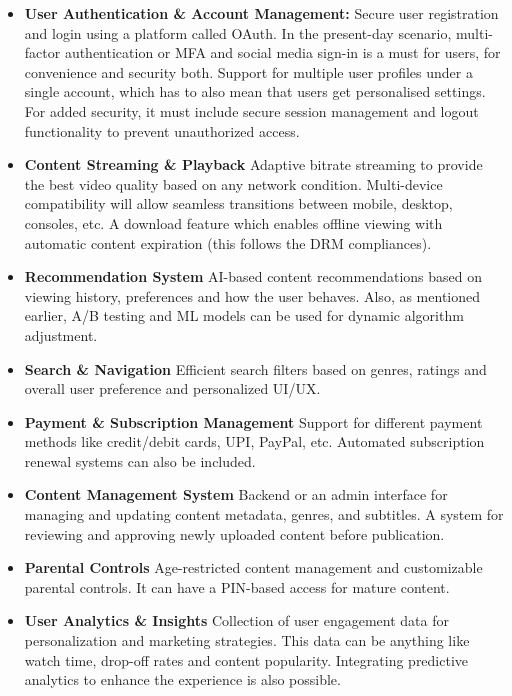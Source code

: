 \documentclass[a4paper,10pt,twoside]{article}
\begin{document}
\begin{itemize}
    \item \textbf{User Authentication \& Account Management:} Secure user registration and login using a platform called OAuth. In the present-day scenario, multi-factor authentication or MFA and social media sign-in is a must for users, for convenience and security both. Support for multiple user profiles under a single account, which has to also mean that users get personalised settings. For added security, it must include secure session management and logout functionality to prevent unauthorized access.
    \item \textbf{Content Streaming \& Playback} Adaptive bitrate streaming to provide the best video quality based on any network condition. Multi-device compatibility will allow seamless transitions between mobile, desktop, consoles, etc. A download feature which enables offline viewing with automatic content expiration (this follows the DRM compliances).
    \item \textbf{Recommendation System} AI-based content recommendations based on viewing history, preferences and how the user behaves. Also, as mentioned earlier, A/B testing and ML models can be used for dynamic algorithm adjustment.
    \item \textbf{Search \& Navigation} Efficient search filters based on genres, ratings and overall user preference and personalized UI/UX.
    \item \textbf{Payment \& Subscription Management} Support for different payment methods like credit/debit cards, UPI, PayPal, etc. Automated subscription renewal systems can also be included.
    \item \textbf{Content Management System} Backend or an admin interface for managing and updating content metadata, genres, and subtitles. A system for reviewing and approving newly uploaded content before publication.
    \item \textbf{Parental Controls} Age-restricted content management and customizable parental controls. It can have a PIN-based access for mature content.
    \item \textbf{User Analytics \& Insights} Collection of user engagement data for personalization and marketing strategies. This data can be anything like watch time, drop-off rates and content popularity. Integrating predictive analytics to enhance the experience is also possible.
\end{itemize}
\end{document}

